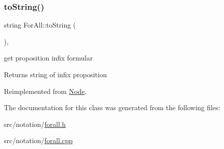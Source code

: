 \mbox{\label{class_for_all_a086dc15d85fe4874c477c72a40577b85}} 
\subsubsection{\texorpdfstring{to\+String()}{toString()}}
{\footnotesize\ttfamily string For\+All\+::to\+String (\begin{DoxyParamCaption}{ }\end{DoxyParamCaption})\hspace{0.3cm}{\ttfamily [override]}, {\ttfamily [virtual]}}



get proposition infix formular 

\begin{DoxyReturn}{Returns}
string of infix proposition 
\end{DoxyReturn}


Reimplemented from \hyperlink{class_node_a0746502074a232243dcac3b96f3ce2d0}{Node}.



The documentation for this class was generated from the following files\+:\begin{DoxyCompactItemize}
\item 
src/notation/\hyperlink{forall_8h}{forall.\+h}\item 
src/notation/\hyperlink{forall_8cpp}{forall.\+cpp}\end{DoxyCompactItemize}

